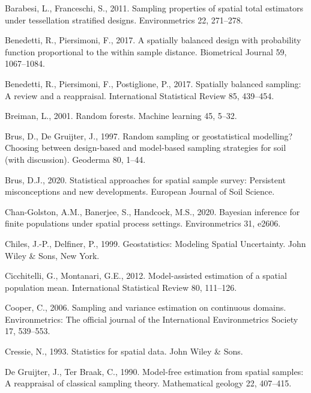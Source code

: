 \documentclass[]{elsarticle} %
\begin{document}
\hypertarget{refs}{}
\leavevmode\hypertarget{ref-barabesi2011sampling}{}%
Barabesi, L., Franceschi, S., 2011. Sampling properties of spatial total
estimators under tessellation stratified designs. Environmetrics 22,
271--278.

\leavevmode\hypertarget{ref-benedetti2017spatially}{}%
Benedetti, R., Piersimoni, F., 2017. A spatially balanced design with
probability function proportional to the within sample distance.
Biometrical Journal 59, 1067--1084.

\leavevmode\hypertarget{ref-benedetti2017spatiallyreview}{}%
Benedetti, R., Piersimoni, F., Postiglione, P., 2017. Spatially balanced
sampling: A review and a reappraisal. International Statistical Review
85, 439--454.

\leavevmode\hypertarget{ref-breiman2001random}{}%
Breiman, L., 2001. Random forests. Machine learning 45, 5--32.

\leavevmode\hypertarget{ref-brus1997random}{}%
Brus, D., De Gruijter, J., 1997. Random sampling or geostatistical
modelling? Choosing between design-based and model-based sampling
strategies for soil (with discussion). Geoderma 80, 1--44.

\leavevmode\hypertarget{ref-brus2020statistical}{}%
Brus, D.J., 2020. Statistical approaches for spatial sample survey:
Persistent misconceptions and new developments. European Journal of Soil
Science.

\leavevmode\hypertarget{ref-chan2020bayesian}{}%
Chan-Golston, A.M., Banerjee, S., Handcock, M.S., 2020. Bayesian
inference for finite populations under spatial process settings.
Environmetrics 31, e2606.

\leavevmode\hypertarget{ref-chiles1999geostatistics}{}%
Chiles, J.-P., Delfiner, P., 1999. Geostatistics: Modeling Spatial
Uncertainty. John Wiley \& Sons, New York.

\leavevmode\hypertarget{ref-cicchitelli2012model}{}%
Cicchitelli, G., Montanari, G.E., 2012. Model-assisted estimation of a
spatial population mean. International Statistical Review 80, 111--126.

\leavevmode\hypertarget{ref-cooper2006sampling}{}%
Cooper, C., 2006. Sampling and variance estimation on continuous
domains. Environmetrics: The official journal of the International
Environmetrics Society 17, 539--553.

\leavevmode\hypertarget{ref-cressie1993statistics}{}%
Cressie, N., 1993. Statistics for spatial data. John Wiley \& Sons.

\leavevmode\hypertarget{ref-de1990model}{}%
De Gruijter, J., Ter Braak, C., 1990. Model-free estimation from spatial
samples: A reappraisal of classical sampling theory. Mathematical
geology 22, 407--415.
\end{document}
